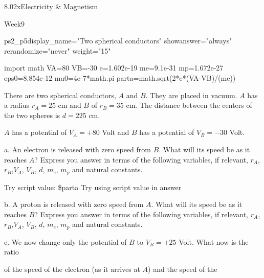 \documentclass[12pt]{article}
\begin{document}
\begin{edXcourse}{8.02x}{Electricity \& Magnetism}

\begin{edXchapter}{Week9}

\begin{edXsequential}

\begin{edXproblem}{ps2_p5}{display_name="Two spherical conductors" showanswer="always" rerandomize="never" weight="15"}


\begin{edXscript}
import math
VA=80
VB=-30
e=1.602e-19 
me=9.1e-31 
mp=1.672e-27 
eps0=8.854e-12
mu0=4e-7*math.pi 
parta=math.sqrt(2*e*(VA-VB)/(me))
\end{edXscript}



There are two spherical conductors, $A$ and $B$. They are placed in vacuum. $A$ has a 
radius $r_A=25$ cm and $B$ of $r_B=35$ cm. The distance between the centers of the two spheres 
is $d=225$ cm.

$A$ has a potential of $V_A=+80$ Volt and $B$ has a potential of $V_B=-30$ Volt.

a. An electron is released with zero speed from $B$. What will its speed be as it 
reaches $A$? Express you answer in terms of the following variables,
if relevant, $r_A$, $r_B$,$V_A$, $V_B$, $d$, $m_e$, $m_p$ and natural
constants. 

Try script value: \$parta
Try using script value in answer


b. A proton is released with zero speed from $A$. What will its speed be as it reaches 
$B$? Express you answer in terms of the following variables,
if relevant, $r_A$, $r_B$,$V_A$, $V_B$, $d$, $m_e$, $m_p$ and natural constants.


c. We now change only the potential of $B$ to $V_B=+25$ Volt. What now is the ratio  

of the speed of the electron (as it arrives at $A$) and the speed of the  



\end{edXproblem}
\end{edXsequential}
\end{edXchapter}
\end{edXcourse}
\end{document}
